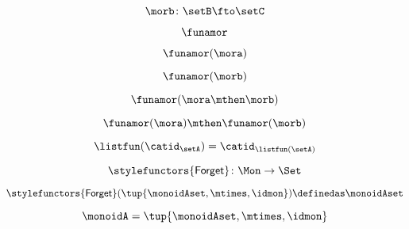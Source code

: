 {\begin{forslides}
        \begin{equation}
            \label{eq:slides-translation-07}
            \morb\colon \setB \fto \setC
        \end{equation}

        \begin{equation}
            \label{eq:slides-translation-08}
            \funamor
        \end{equation}

        \begin{equation}
            \label{eq:slides-translation-09}
            \funamor(\mora)
        \end{equation}

        \begin{equation}
            \label{eq:slides-translation-10}
            \funamor(\morb)
        \end{equation}

        \begin{equation}
            \label{eq:slides-translation-11}
            \funamor(\mora \mthen \morb)
        \end{equation}

        \begin{equation}
            \label{eq:slides-translation-12}
            \funamor (\mora) \mthen \funamor (\morb)
        \end{equation}

        \begin{equation}
            \label{eq:slides-translation-13}
            \listfun(\catid_\setA) = \catid_{\listfun(\setA)}
        \end{equation}

        \begin{equation}
            \label{eq:slides-translation-14}
            \stylefunctors{\mathsf{Forget}} \colon \Mon \to \Set
        \end{equation}

        \begin{equation}
            \label{eq:slides-translation-15}
            \stylefunctors{\mathsf{Forget}}(\tup{{\monoidAset}, \mtimes, \idmon}) \definedas \monoidAset
        \end{equation}

        \begin{equation}
            \label{eq:slides-translation-16}
            \monoidA = \tup{{\monoidAset}, \mtimes, \idmon}
        \end{equation}


\end{forslides}}
